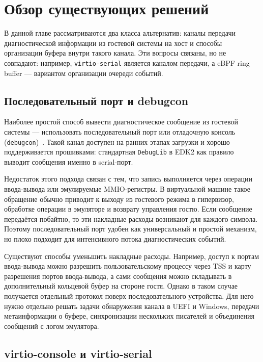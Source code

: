 \section{Обзор существующих решений}
\label{sec:Chapter1} 

В данной главе рассматриваются два класса альтернатив: каналы передачи
диагностической информации из гостевой системы на хост и способы организации
буфера внутри такого канала. Эти вопросы связаны, но не совпадают: например,
\texttt{virtio-serial} является каналом передачи, а eBPF ring buffer ---
вариантом организации очереди событий.

\subsection{Последовательный порт и debugcon}
\label{sec:ch1-serial}

Наиболее простой способ вывести диагностическое сообщение из гостевой системы ---
использовать последовательный порт или отладочную консоль
(\texttt{debugcon})~\cite{qemu_debugcon}. Такой канал доступен на ранних этапах
загрузки и хорошо поддерживается прошивками: стандартная \texttt{DebugLib} в EDK2
как правило выводит сообщения именно в serial-порт.

Недостаток этого подхода связан с тем, что запись выполняется через операции
ввода-вывода или эмулируемые MMIO-регистры. В виртуальной машине такое обращение
обычно приводит к выходу из гостевого режима в гипервизор, обработке операции в
эмуляторе и возврату управления гостю. Если сообщение передаётся побайтно, то
эти накладные расходы возникают для каждого символа. Поэтому последовательный
порт удобен как универсальный и простой механизм, но плохо подходит для
интенсивного потока диагностических событий.

Существуют способы уменьшить накладные расходы. Например, доступ к портам
ввода-вывода можно разрешить пользовательскому процессу через TSS и карту
разрешения портов ввода-вывода, а сами сообщения можно складывать в
дополнительный кольцевой буфер на стороне гостя. Однако в таком случае
получается отдельный протокол поверх последовательного устройства. Для него
нужно отдельно решать задачи обнаружения канала в UEFI и Windows, передачи
метаинформации о буфере, синхронизации нескольких писателей и объединения
сообщений с логом эмулятора.

\subsection{virtio-console и virtio-serial}
\label{sec:ch1-virtio}

